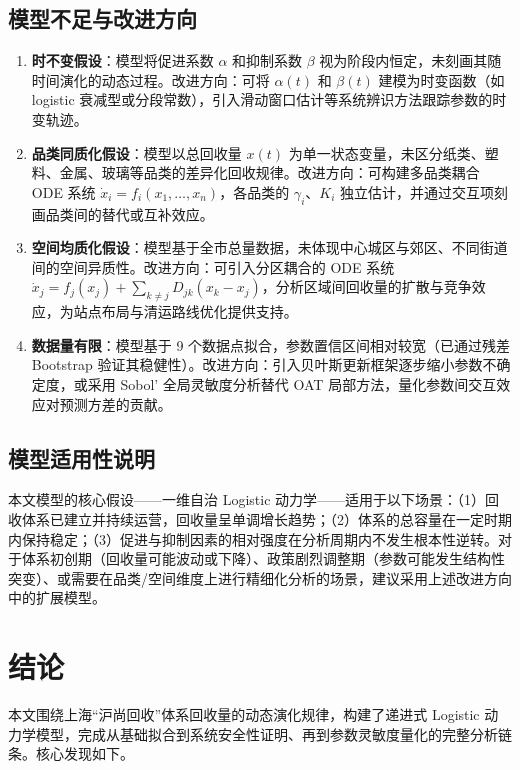 \documentclass[12pt,a4paper]{ctexart}
\begin{document}
\begin{table}[htbp]
\subsection{模型不足与改进方向}

\begin{enumerate}
    \item \textbf{时不变假设}：模型将促进系数 $\alpha$ 和抑制系数 $\beta$ 视为阶段内恒定，未刻画其随时间演化的动态过程。改进方向：可将 $\alpha(t)$ 和 $\beta(t)$ 建模为时变函数（如 logistic 衰减型或分段常数），引入滑动窗口估计等系统辨识方法跟踪参数的时变轨迹。

    \item \textbf{品类同质化假设}：模型以总回收量 $x(t)$ 为单一状态变量，未区分纸类、塑料、金属、玻璃等品类的差异化回收规律。改进方向：可构建多品类耦合 ODE 系统 $\dot{x}_i = f_i(x_1, \dots, x_n)$，各品类的 $\gamma_i$、$K_i$ 独立估计，并通过交互项刻画品类间的替代或互补效应。

    \item \textbf{空间均质化假设}：模型基于全市总量数据，未体现中心城区与郊区、不同街道间的空间异质性。改进方向：可引入分区耦合的 ODE 系统 $\dot{x}_j = f_j(x_j) + \sum_{k \neq j} D_{jk}(x_k - x_j)$，分析区域间回收量的扩散与竞争效应，为站点布局与清运路线优化提供支持。

    \item \textbf{数据量有限}：模型基于 9 个数据点拟合，参数置信区间相对较宽（已通过残差 Bootstrap 验证其稳健性）。改进方向：引入贝叶斯更新框架逐步缩小参数不确定度，或采用 Sobol' 全局灵敏度分析替代 OAT 局部方法，量化参数间交互效应对预测方差的贡献。
\end{enumerate}
\subsection{模型适用性说明}

本文模型的核心假设——一维自治 Logistic 动力学——适用于以下场景：（1）回收体系已建立并持续运营，回收量呈单调增长趋势；（2）体系的总容量在一定时期内保持稳定；（3）促进与抑制因素的相对强度在分析周期内不发生根本性逆转。对于体系初创期（回收量可能波动或下降）、政策剧烈调整期（参数可能发生结构性突变）、或需要在品类/空间维度上进行精细化分析的场景，建议采用上述改进方向中的扩展模型。

\section{结论}

本文围绕上海``沪尚回收''体系回收量的动态演化规律，构建了递进式 Logistic 动力学模型，完成从基础拟合到系统安全性证明、再到参数灵敏度量化的完整分析链条。核心发现如下。


\end{table}
\end{document}
